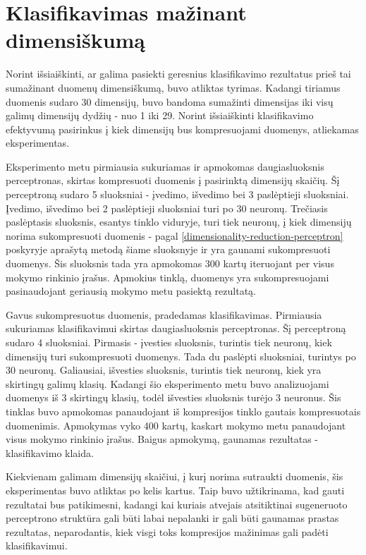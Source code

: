 \documentclass{VUMIFPSbakalaurinis}
\begin{document}
\section{Klasifikavimas mažinant dimensiškumą} \label{classification-dimensionality-reduction}

Norint išsiaiškinti, ar galima pasiekti geresnius klasifikavimo rezultatus prieš tai sumažinant duomenų dimensiškumą, buvo atliktas tyrimas.
Kadangi tiriamus duomenis sudaro 30 dimensijų, buvo bandoma sumažinti dimensijas iki visų galimų dimensijų dydžių - nuo 1 iki 29.
Norint išsiaiškinti klasifikavimo efektyvumą pasirinkus į kiek dimensijų bus kompresuojami duomenys, atliekamas eksperimentas.

Eksperimento metu pirmiausia sukuriamas ir apmokomas daugiasluoksnis perceptronas, skirtas kompresuoti duomenis į pasirinktą dimensijų skaičių.
Šį perceptroną sudaro 5 sluoksniai - įvedimo, išvedimo bei 3 paslėptieji sluoksniai.
Įvedimo, išvedimo bei 2 paslėptieji sluoksniai turi po 30 neuronų.
Trečiasis paslėptasis sluoksnis, esantys tinklo viduryje, turi tiek neuronų, į kiek dimensijų norima sukompresuoti duomenis - pagal \ref{dimensionality-reduction-perceptron} poskyryje aprašytą metodą šiame sluoksnyje ir yra gaunami sukompresuoti duomenys.
Šis sluoksnis tada yra apmokomas 300 kartų iteruojant per visus mokymo rinkinio įrašus.
Apmokius tinklą, duomenys yra sukompresuojami pasinaudojant geriausią mokymo metu pasiektą rezultatą.

Gavus sukompresuotus duomenis, pradedamas klasifikavimas.
Pirmiausia sukuriamas klasifikavimui skirtas daugiasluoksnis perceptronas.
Šį perceptroną sudaro 4 sluoksniai.
Pirmasis - įvesties sluoksnis, turintis tiek neuronų, kiek dimensijų turi sukompresuoti duomenys.
Tada du paslėpti sluoksniai, turintys po 30 neuronų.
Galiausiai, išvesties sluoksnis, turintis tiek neuronų, kiek yra skirtingų galimų klasių.
Kadangi šio eksperimento metu buvo analizuojami duomenys iš 3 skirtingų klasių, todėl išvesties sluoksnis turėjo 3 neuronus.
Šis tinklas buvo apmokomas panaudojant iš kompresijos tinklo gautais kompresuotais duomenimis.
Apmokymas vyko 400 kartų, kaskart mokymo metu panaudojant visus mokymo rinkinio įrašus.
Baigus apmokymą, gaunamas rezultatas - klasifikavimo klaida.

Kiekvienam galimam dimensijų skaičiui, į kurį norima sutraukti duomenis, šis eksperimentas buvo atliktas po kelis kartus.
Taip buvo užtikrinama, kad gauti rezultatai bus patikimesni, kadangi kai kuriais atvejais atsitiktinai sugeneruoto perceptrono struktūra gali būti labai nepalanki ir gali būti gaunamas prastas rezultatas, neparodantis, kiek visgi toks kompresijos mažinimas gali padėti klasifikavimui.
\end{document}
